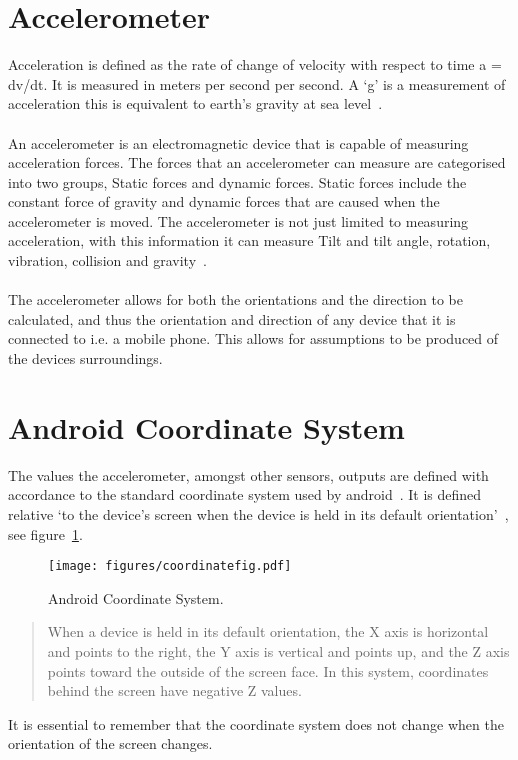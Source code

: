 \section{Accelerometer} %
\label{sec:section_accelerometer}
Acceleration is defined as the rate of change of velocity with respect to time a = dv/dt. It is measured in meters per second per second. A `g' is a measurement of acceleration this is equivalent to earth’s gravity at sea level~\cite{tiacc}.
\paragraph{}
An accelerometer is an electromagnetic device that is capable of measuring acceleration forces. The forces that an accelerometer can measure are categorised into two groups, Static forces and dynamic forces. Static forces include the constant force of gravity and dynamic forces that are caused when the accelerometer is moved. The accelerometer is not just limited to measuring acceleration, with this information it can measure Tilt and tilt angle, rotation, vibration, collision and gravity~\cite{lindsay2005parallax}.
\paragraph{} %
The accelerometer allows for both the orientations and the direction to be calculated, and thus the orientation and direction of any device that it is connected to i.e. a mobile phone.  This allows for assumptions to be produced of the devices surroundings.


\section{Android Coordinate System}
\label{sec:coordinate}
The values the accelerometer, amongst other sensors, outputs are defined with accordance to the standard coordinate system used by android~\cite{android2013coordinate}. It is defined relative `to the device's screen when the device is held in its default orientation'~\cite{android2013coordinate}, see figure~\ref{fig:Figures_coordinate}.
\begin{figure}[h]
  \texttt{[image: figures/coordinatefig.pdf]}
  \caption{Android Coordinate System.}
  \label{fig:Figures_coordinate}
\end{figure} 
\begin{quote}
When a device is held in its default orientation, the X axis is horizontal and points to the right, the Y axis is vertical and points up, and the Z axis points toward the outside of the screen face. In this system, coordinates behind the screen have negative Z values.
\end{quote}
It is essential to remember that the coordinate system does not change when the orientation of the screen changes.